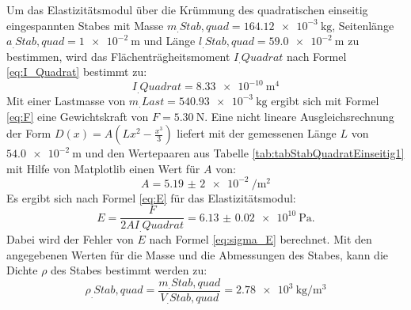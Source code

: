 Um das Elastizitätsmodul über die Krümmung des quadratischen einseitig eingespannten Stabes mit Masse $m_.{Stab,quad} = \SI{164.12e-3}{\kilogram}$, Seitenlänge $a_.{Stab,quad} = \SI{1e-2}{\metre}$ und Länge $l_.{Stab,quad}=\SI{59.0e-2}{\metre}$ zu bestimmen, wird das Flächenträgheitsmoment $I_.{Quadrat}$ nach Formel \eqref{eq:I_Quadrat} bestimmt zu:
\[
	I_.{Quadrat}=\SI{8.33e-10}{\metre\tothe{4}}
\]
Mit einer Lastmasse von $m_.{Last} = \SI{540,93e-3}{\kilogram}$ ergibt sich mit Formel \eqref{eq:F} eine Gewichtskraft von $F=\SI{5.30}{\newton}$. Eine nicht lineare Ausgleichsrechnung der Form $D(x) = A ( L x^2 - \frac{x^3}{3})$ liefert mit der gemessenen Länge $L$ von $\SI{54.0e-2}{\metre}$ und den Wertepaaren aus Tabelle \ref{tab:tabStabQuadratEinseitig1} mit Hilfe von Matplotlib \cite{matplotlib} einen Wert für $A$ von:
\[
	A = \SI{5,19(2)e-2}{\per\metre\squared}
\]
Es ergibt sich nach Formel \eqref{eq:E} für das Elastizitätsmodul:
\[
	E = \frac{F}{2AI_.{Quadrat}} = \SI{6.13(2)e10}{\pascal}\text{.}
\]
Dabei wird der Fehler von $E$ nach Formel \eqref{eq:sigma_E} berechnet.
Mit den angegebenen Werten für die Masse und die Abmessungen des Stabes, kann die Dichte $\rho$ des Stabes bestimmt werden zu:
\[
	\rho_.{Stab,quad} = \frac{m_.{Stab,quad}}{V_.{Stab,quad}}=\SI{2,78e3}{\kilogram\per\cubic\metre}
\]
